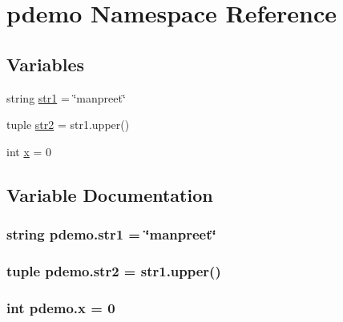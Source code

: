\hypertarget{namespacepdemo}{\section{pdemo Namespace Reference}
\label{namespacepdemo}
}
\subsection*{Variables}
\begin{DoxyCompactItemize}
\item 
string \hyperlink{namespacepdemo_ace6eea1065f57616d602bcb97165edb1}{str1} = \char`\"{}manpreet\char`\"{}
\item 
tuple \hyperlink{namespacepdemo_abe897b7c7f2cbd4b252a9fa369bc3d2c}{str2} = str1.\-upper()
\item 
int \hyperlink{namespacepdemo_aa13a222e37b298a180a5fd3a1ee3e74c}{x} = 0
\end{DoxyCompactItemize}


\subsection{Variable Documentation}
\hypertarget{namespacepdemo_ace6eea1065f57616d602bcb97165edb1}{
\subsubsection[{str1}]{\setlength{\rightskip}{0pt plus 5cm}string pdemo.\-str1 = \char`\"{}manpreet\char`\"{}}}\label{namespacepdemo_ace6eea1065f57616d602bcb97165edb1}
\hypertarget{namespacepdemo_abe897b7c7f2cbd4b252a9fa369bc3d2c}{
\subsubsection[{str2}]{\setlength{\rightskip}{0pt plus 5cm}tuple pdemo.\-str2 = str1.\-upper()}}\label{namespacepdemo_abe897b7c7f2cbd4b252a9fa369bc3d2c}
\hypertarget{namespacepdemo_aa13a222e37b298a180a5fd3a1ee3e74c}{
\subsubsection[{x}]{\setlength{\rightskip}{0pt plus 5cm}int pdemo.\-x = 0}}\label{namespacepdemo_aa13a222e37b298a180a5fd3a1ee3e74c}
